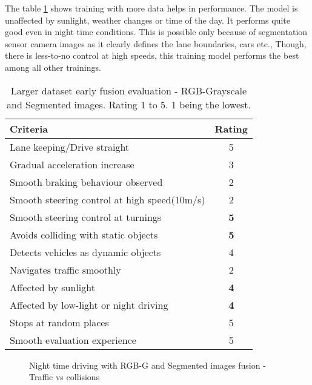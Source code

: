 The table \ref{table:earlyfusionrgbseg200k} shows training with more data helps in
performance. The model is unaffected by sunlight, weather changes or time of the day. It
performs quite good even in night time conditions. This is possible only because of
segmentation sensor camera images as it clearly defines the lane boundaries, cars etc.,
Though, there is less-to-no control at high speeds, this training model performs the best
among all other trainings.
\begin{table}[!ht]
    \centering
\begin{tabular}{lc}
    \toprule
    Criteria & Rating \\\midrule
    Lane keeping/Drive straight  & 5  \\
    Gradual acceleration increase  & 3\\
    Smooth braking behaviour observed & 2 \\
    Smooth steering control at high speed(10m/s) & 2\\
    Smooth steering control at turnings & \textbf{5}\\
    Avoids colliding with static objects & \textbf{5} \\
    Detects vehicles as dynamic objects & 4\\
    Navigates traffic smoothly & 2\\
    Affected by sunlight & \textbf{4} \\
    Affected by low-light or night driving & \textbf{4} \\
    Stops at random places & 5 \\
    Smooth evaluation experience & 5 \\\bottomrule
\end{tabular}
\caption{Larger dataset early fusion evaluation - RGB-Grayscale and Segmented images.
Rating 1 to 5. 1 being the lowest.}
\label{table:earlyfusionrgbseg200k}
\end{table}
\begin{figure}[!ht]
    \centering
    \def\svgwidth{0.5\textwidth}
    
    \caption{Night time driving with RGB-G and Segmented images fusion - Traffic vs
    collisions}
    \label{fig:224kdatafusionnight}
\end{figure}
